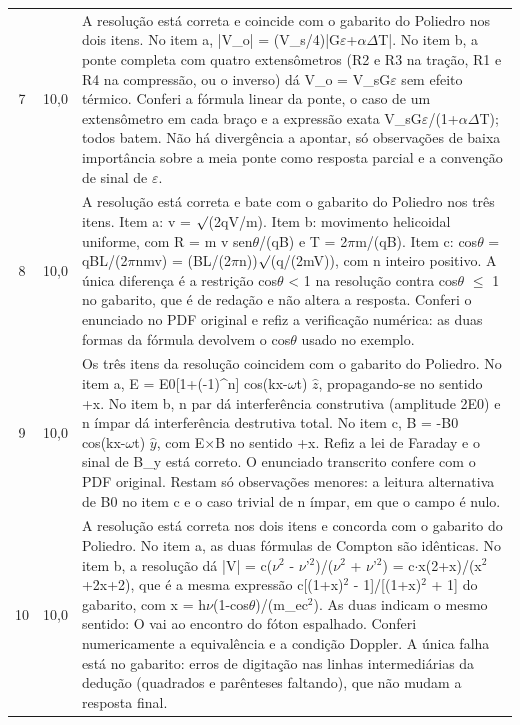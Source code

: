 \documentclass{article}%
\begin{document}
\begin{longtable}{@{}c c p{}@{}}
7 & 10,0 & A resolução está correta e coincide com o gabarito do Poliedro nos dois itens. No item a, |V\_o| = (V\_s/4)|G$\varepsilon$+$\alpha$$\Delta$T|. No item b, a ponte completa com quatro extensômetros (R2 e R3 na tração, R1 e R4 na compressão, ou o inverso) dá V\_o = V\_sG$\varepsilon$ sem efeito térmico. Conferi a fórmula linear da ponte, o caso de um extensômetro em cada braço e a expressão exata V\_sG$\varepsilon$/(1+$\alpha$$\Delta$T); todos batem. Não há divergência a apontar, só observações de baixa importância sobre a meia ponte como resposta parcial e a convenção de sinal de $\varepsilon$. \\
8 & 10,0 & A resolução está correta e bate com o gabarito do Poliedro nos três itens. Item a: v = $\surd$(2qV/m). Item b: movimento helicoidal uniforme, com R = m v sen$\theta$/(qB) e T = 2$\pi$m/(qB). Item c: cos$\theta$ = qBL/(2$\pi$nmv) = (BL/(2$\pi$n))$\surd$(q/(2mV)), com n inteiro positivo. A única diferença é a restrição cos$\theta$ < 1 na resolução contra cos$\theta$ $\leq$ 1 no gabarito, que é de redação e não altera a resposta. Conferi o enunciado no PDF original e refiz a verificação numérica: as duas formas da fórmula devolvem o cos$\theta$ usado no exemplo. \\
9 & 10,0 & Os três itens da resolução coincidem com o gabarito do Poliedro. No item a, E = E0{[}1+(-1)\^{}n{]} cos(kx-$\omega$t) $\hat z$, propagando{-}se no sentido +x. No item b, n par dá interferência construtiva (amplitude 2E0) e n ímpar dá interferência destrutiva total. No item c, B = -B0 cos(kx-$\omega$t) $\hat y$, com E$\times$B no sentido +x. Refiz a lei de Faraday e o sinal de B\_y está correto. O enunciado transcrito confere com o PDF original. Restam só observações menores: a leitura alternativa de B0 no item c e o caso trivial de n ímpar, em que o campo é nulo. \\
10 & 10,0 & A resolução está correta nos dois itens e concorda com o gabarito do Poliedro. No item a, as duas fórmulas de Compton são idênticas. No item b, a resolução dá |V| = c($\nu$$^2$ - $\nu$'$^2$)/($\nu$$^2$ + $\nu$'$^2$) = c$\cdot$x(2+x)/(x$^2$+2x+2), que é a mesma expressão c{[}(1+x)$^2$ - 1{]}/{[}(1+x)$^2$ + 1{]} do gabarito, com x = h$\nu$(1-cos$\theta$)/(m\_ec$^2$). As duas indicam o mesmo sentido: O vai ao encontro do fóton espalhado. Conferi numericamente a equivalência e a condição Doppler. A única falha está no gabarito: erros de digitação nas linhas intermediárias da dedução (quadrados e parênteses faltando), que não mudam a resposta final. \\
\bottomrule\end{longtable}%
\end{document}
